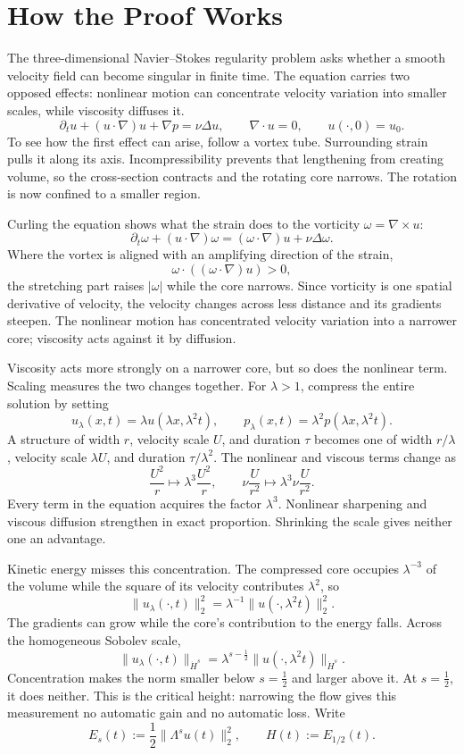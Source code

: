 \documentclass[11pt]{article}
\begin{document}
\section*{How the Proof Works}

The three-dimensional Navier--Stokes regularity problem asks whether a smooth velocity field can become singular in finite time. The equation carries two opposed effects: nonlinear motion can concentrate velocity variation into smaller scales, while viscosity diffuses it.
\[
\partial_tu+(u\cdot\nabla)u+\nabla p=\nu\Delta u,
\qquad \nabla\cdot u=0,
\qquad u(\cdot,0)=u_0.
\]
To see how the first effect can arise, follow a vortex tube. Surrounding strain pulls it along its axis. Incompressibility prevents that lengthening from creating volume, so the cross-section contracts and the rotating core narrows. The rotation is now confined to a smaller region.

Curling the equation shows what the strain does to the vorticity \(\omega=\nabla\times u\):
\[
\partial_t\omega+(u\cdot\nabla)\omega
=(\omega\cdot\nabla)u+\nu\Delta\omega.
\]
Where the vortex is aligned with an amplifying direction of the strain,
\[
\omega\cdot((\omega\cdot\nabla)u)>0,
\]
the stretching part raises \(\lvert\omega\rvert\) while the core narrows. Since vorticity is one spatial derivative of velocity, the velocity changes across less distance and its gradients steepen. The nonlinear motion has concentrated velocity variation into a narrower core; viscosity acts against it by diffusion.

Viscosity acts more strongly on a narrower core, but so does the nonlinear term. Scaling measures the two changes together. For \(\lambda>1\), compress the entire solution by setting
\[
u_\lambda(x,t)=\lambda u(\lambda x,\lambda^2t),
\qquad
p_\lambda(x,t)=\lambda^2p(\lambda x,\lambda^2t).
\]
A structure of width \(r\), velocity scale \(U\), and duration \(\tau\) becomes one of width \(r/\lambda\), velocity scale \(\lambda U\), and duration \(\tau/\lambda^2\). The nonlinear and viscous terms change as
\[
\frac{U^2}{r}
\longmapsto
\lambda^3\frac{U^2}{r},
\qquad
\nu\frac{U}{r^2}
\longmapsto
\lambda^3\nu\frac{U}{r^2}.
\]
Every term in the equation acquires the factor \(\lambda^3\). Nonlinear sharpening and viscous diffusion strengthen in exact proportion. Shrinking the scale gives neither one an advantage.

Kinetic energy misses this concentration. The compressed core occupies \(\lambda^{-3}\) of the volume while the square of its velocity contributes \(\lambda^2\), so
\[
\|u_\lambda(\cdot,t)\|_2^2
=\lambda^{-1}\|u(\cdot,\lambda^2t)\|_2^2.
\]
The gradients can grow while the core's contribution to the energy falls. Across the homogeneous Sobolev scale,
\[
\|u_\lambda(\cdot,t)\|_{\dot H^s}
=\lambda^{s-\frac12}
\|u(\cdot,\lambda^2t)\|_{\dot H^s}.
\]
Concentration makes the norm smaller below \(s=\tfrac12\) and larger above it. At \(s=\tfrac12\), it does neither. This is the critical height: narrowing the flow gives this measurement no automatic gain and no automatic loss. Write
\[
E_s(t):=\frac12\|\Lambda^su(t)\|_2^2,
\qquad
H(t):=E_{1/2}(t).
\]
\end{document}
